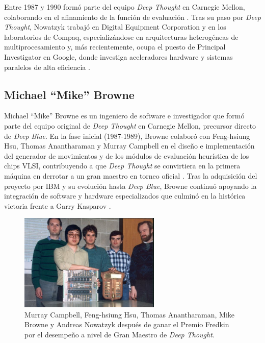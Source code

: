 \documentclass[a4paper, 12pt]{article}
\begin{document}
Entre 1987 y 1990 formó parte del equipo \emph{Deep Thought} en Carnegie 
Mellon, colaborando en el afinamiento de la función de evaluación \cite{chessprogNowatzyk}. 
Tras su paso por 
\emph{Deep Thought}, Nowatzyk trabajó en Digital Equipment Corporation y 
en los laboratorios de Compaq, especializándose en arquitecturas 
heterogéneas de multiprocesamiento y, más recientemente, ocupa el 
puesto de Principal Investigator en Google, donde investiga 
aceleradores hardware y sistemas paralelos de alta eficiencia 
\cite{cmuNowatzyk}.


\subsection*{Michael “Mike” Browne}

Michael “Mike” Browne es un ingeniero de software e investigador 
que formó parte del equipo original de \emph{Deep Thought} en 
Carnegie Mellon, precursor directo de \emph{Deep Blue}. En la fase 
inicial (1987-1989), Browne colaboró con Feng-hsiung Hsu, Thomas 
Anantharaman y Murray Campbell en el diseño e implementación del 
generador de movimientos y de los módulos de evaluación heurística 
de los chips VLSI, contribuyendo a que \emph{Deep Thought} se convirtiera 
en la primera máquina en derrotar a un gran maestro en torneo 
oficial \cite{chessprog_deepthought}. Tras la adquisición del 
proyecto por IBM y su evolución hasta \emph{Deep Blue}, Browne continuó 
apoyando la integración de software y hardware especializados que 
culminó en la histórica victoria frente a Garry Kasparov 
\cite{ibmHistoryDeepBlue}.



\begin{figure}[h]
    \centering
    \includegraphics[width=0.6\textwidth]{assets/team.jpg}
    \caption{Murray Campbell, Feng-hsiung Hsu, Thomas Anantharaman, Mike Browne y Andreas Nowatzyk
    después de ganar el Premio Fredkin por el desempeño a nivel de Gran Maestro de \emph{Deep Thought}.}
    \label{fig:team2}
\end{figure}
\end{document}
